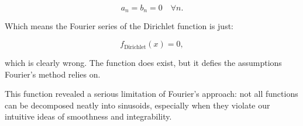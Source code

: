 \[
a_n = b_n = 0 \quad \forall n.
\]

Which means the Fourier series of the Dirichlet function is just:

\[
f_{\text{Dirichlet}}(x) = 0,
\]

which is clearly wrong. The function does exist, but it defies the assumptions Fourier’s method relies on.

\begin{center}
\end{center}

\bigskip

This function revealed a serious limitation of Fourier’s approach: not all functions can be decomposed neatly into sinusoids, especially when they violate our intuitive ideas of smoothness and integrability.
